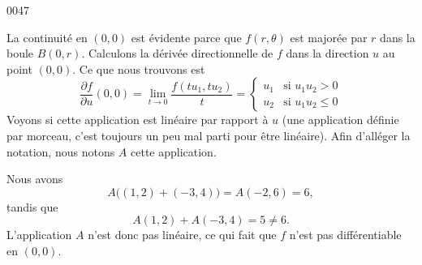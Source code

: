 
\begin{corrige}{0047}

La continuité en $(0,0)$ est évidente parce que $f(r,\theta)$ est majorée par $r$ dans la boule $B(0,r)$. Calculons la dérivée directionnelle de $f$ dans la direction $u$ au point $(0,0)$. Ce que nous trouvons est
\begin{equation}
	\frac{ \partial f }{ \partial u }(0,0)=\lim_{t\to 0}\frac{ f(tu_1,tu_2) }{ t }=
\begin{cases}
	u_1	&	\text{si }u_1u_2>0\\
	u_2	&	 \text{si }u_1u_2\leq 0
\end{cases}
\end{equation}
Voyons si cette application est linéaire par rapport à $u$ (une application définie par morceau, c'est toujours un peu mal parti pour être linéaire). Afin d'alléger la notation, nous notons $A$ cette application.

Nous avons
\begin{equation}
	A\big( (1,2)+(-3,4) \big)=A(-2,6)=6,
\end{equation}
tandis que
\begin{equation}
	A(1,2)+A(-3,4)=5\neq 6.
\end{equation}
L'application $A$ n'est donc pas linéaire, ce qui fait que $f$ n'est pas différentiable en $(0,0)$.

\end{corrige}
